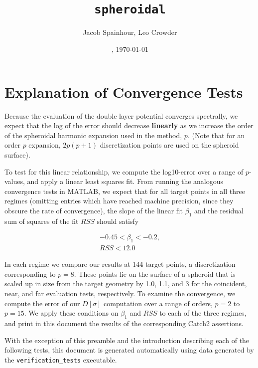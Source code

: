 \documentclass[12pt]{article}
\begin{document}
\title{  \\ \texttt{spheroidal}}

\author{Jacob Spainhour, Leo Crowder}
\date{\currenttime, \today}
\maketitle

\section*{Explanation of Convergence Tests}

Because the evaluation of the double layer potential converges spectrally, we expect that the log of the error should decrease \textbf{linearly} as we increase the order of the spheroidal harmonic expansion used in the method, $p$.
(Note that for an order $p$ expansion, $2p(p+1)$ discretization points are used on the spheroid surface).

To test for this linear relationship, we compute the log10-error over a range of $p$-values, and apply a linear least squares fit.
From running the analogous convergence tests in MATLAB, we expect that for all target points in all three regimes (omitting entries which have reached machine precision, since they obscure the rate of convergence), the slope of the linear fit $\beta_1$ and the residual sum of squares of the fit $RSS$ should satisfy

\begin{gather*}
    -0.45 < \beta_1< -0.2,\\
    RSS < 12.0
\end{gather*}

In each regime we compare our results at 144 target points, a discretization corresponding to $p=8$. 
These points lie on the surface of a spheroid that is scaled up in size from the target geometry by 1.0, 1.1, and 3 for the coincident, near, and far evaluation tests, respectively. 
To examine the convergence, we compute the error of our $D[\sigma]$ computation over a range of orders, $p=2$ to $p=15$. 
We apply these conditions on $\beta_1$ and $RSS$ to each of the three regimes, and print in this document the results of the corresponding Catch2 assertions.

With the exception of this preamble and the introduction describing each of the following tests, this document is generated automatically using data generated by the \texttt{verification\_tests} executable.
\pagebreak
\end{document}
